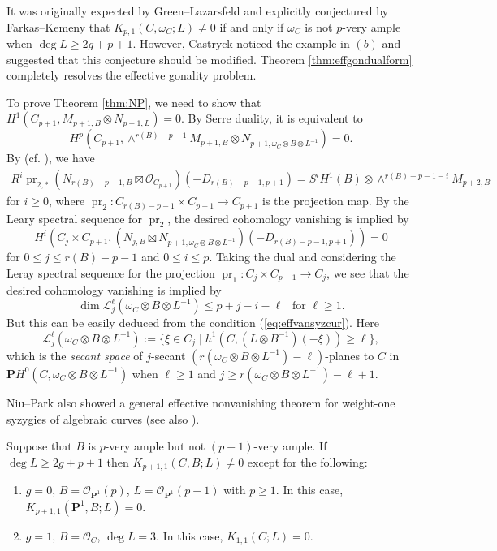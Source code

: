 \documentclass[graybox]{svmult}
\newcommand{\sO}{\mathscr{O}}
\def\nP{\mathbf{P}}
\DeclareMathOperator{\pr}{pr}
\begin{document}
It was originally expected by Green--Lazarsfeld \cite[page 87]{GL1} and explicitly conjectured by Farkas--Kemeny \cite[page 3]{FK2} that $K_{p,1}(C, \omega_C; L)\neq 0$ if and only if $\omega_C$ is not $p$-very ample when $\deg L \geq 2g+p+1$. However, Castryck \cite{Castryck} noticed the example in $(b)$ and suggested that this conjecture should be modified. Theorem \ref{thm:effgondualform} completely resolves the effective gonality problem.

To prove Theorem \ref{thm:NP}, we need to show that $H^1(C_{p+1}, M_{p+1,B} \otimes N_{p+1, L})=0$. By Serre duality, it is equivalent to
$$
H^p(C_{p+1}, \wedge^{r(B)-p-1} M_{p+1, B} \otimes N_{p+1, \omega_C \otimes B \otimes L^{-1}})=0.
$$
By \cite[Lemma 2.3]{NP} (cf. \cite[Lemma 3.3]{CKP}), we have
\begin{align*}
R^i \pr_{2,*} (N_{r(B)-p-1, B} \boxtimes \sO_{C_{p+1}})(-D_{r(B)-p-1, p+1})=S^i H^1(B) \otimes  \wedge^{r(B)-p-1-i} M_{p+2, B}
\end{align*}
for $i \geq 0$, where $\pr_2 \colon  C_{r(B)-p-1} \times C_{p+1} \to C_{p+1}$ is the projection map. By the Leary spectral sequence for $\pr_2$,  the desired cohomology vanishing is implied by 
$$
H^i(C_j \times C_{p+1}, (N_{j, B} \boxtimes N_{p+1, \omega_C \otimes B \otimes L^{-1}})(-D_{r(B)-p-1, p+1})) = 0
$$
for $0 \leq j \leq r(B)-p-1$ and $0 \leq i \leq p$. Taking the dual and considering the Leray spectral sequence for the projection $\pr_1 \colon C_j \times C_{p+1} \to C_j$, we see that the desired cohomology vanishing is implied by
$$
\dim \mathcal{L}_j^{\ell}(\omega_C \otimes B \otimes L^{-1})  \leq p+j-i-\ell~~\text{ for $\ell \geq 1$}.
$$
But this can be easily deduced from the condition (\ref{eq:effvansyzcur}). Here 
$$
\mathcal{L}_j^{\ell}(\omega_C \otimes B \otimes L^{-1}) := \{\xi \in C_j \mid h^1(C, (L \otimes B^{-1})(-\xi)) \geq \ell\},
$$ 
which is the \emph{secant space} of $j$-secant $(r(\omega_C \otimes B \otimes L^{-1})-\ell)$-planes to $C$ in $\nP H^0(C, \omega_C \otimes B \otimes L^{-1})$ when $\ell \geq 1$ and $j \geq r(\omega_C \otimes B \otimes L^{-1})-\ell+1$. 

Niu--Park \cite[Corollary 4.7]{NP} also showed a general effective nonvanishing theorem for weight-one syzygies of algebraic curves (see also \cite[Proposition 3.5]{Agostini1}).

\begin{proposition}\label{prop:effnonvanK_{p,1}(C,B;L)}
Suppose that $B$ is $p$-very ample but not $(p+1)$-very ample. 
If $\deg L\geq 2g+p+1$ then $K_{p+1,1}(C, B;L) \neq 0$ except for the following:
\begin{enumerate}
\item[$(a)$] $g=0$, $B=\sO_{\nP^1}(p)$, $L=\sO_{\nP^1}(p+1)$ with $p \geq 1$. In this case, $K_{p+1,1}(\nP^1,B; L)=0$.
\item[$(b)$] $g=1$, $B=\sO_C$, $\deg L=3$. In this case, $K_{1,1}(C; L)=0$.
\end{enumerate}
\end{proposition}
\end{document}
